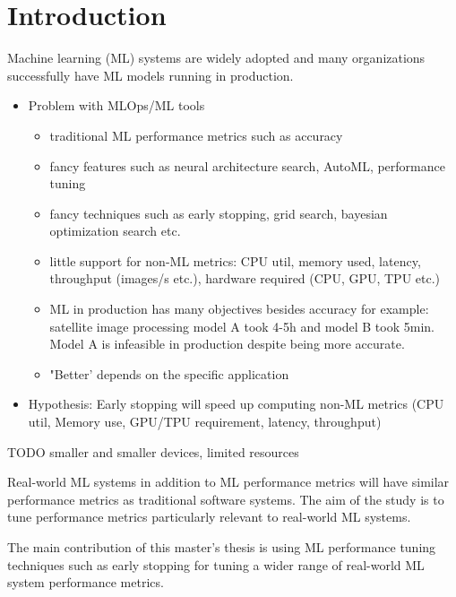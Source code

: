\chapter{Introduction}

Machine learning (ML) systems are widely adopted and many organizations successfully have ML models running in production.

\begin{itemize}
    \item Problem with MLOps/ML tools
        \begin{itemize}
            \item traditional ML performance metrics such as accuracy
            \item fancy features such as neural architecture search, AutoML, performance tuning
            \item fancy techniques such as early stopping, grid search, bayesian optimization search etc.
            \item little support for non-ML metrics: CPU util, memory used, latency, throughput (images/s etc.), hardware required (CPU, GPU, TPU etc.)
            \item ML in production has many objectives besides accuracy for example: satellite image processing model A took 4-5h and model B took 5min. Model A is infeasible in production despite being more accurate.
            \item "Better' depends on the specific application
        \end{itemize}
    \item Hypothesis: Early stopping will speed up computing non-ML metrics (CPU util, Memory use, GPU/TPU requirement, latency, throughput)
\end{itemize}

TODO smaller and smaller devices, limited resources

Real-world ML systems in addition to ML performance metrics will have similar performance metrics as traditional software systems. The aim of the study is to tune performance metrics particularly relevant to real-world ML systems. 



The main contribution of this master's thesis is using ML performance tuning techniques such as early stopping for tuning a wider range of real-world ML system performance metrics.